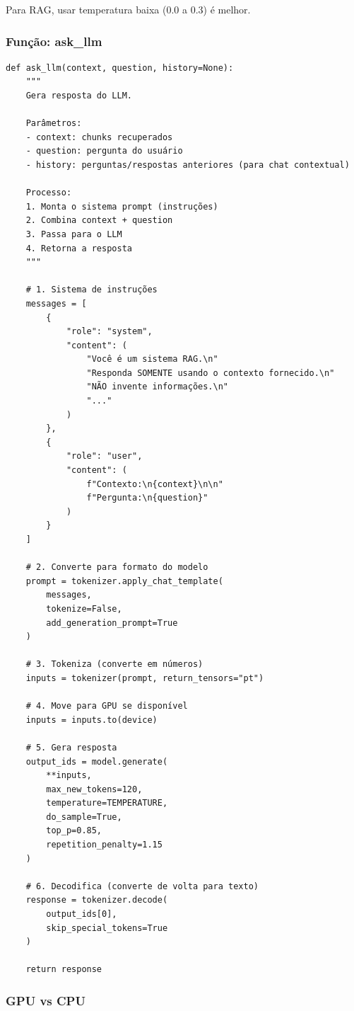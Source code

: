 \documentclass[12pt,a4paper]{article}
\begin{document}
Para RAG, usar temperatura baixa (0.0 a 0.3) é melhor.

\subsubsection{Função: ask\_llm}

\begin{lstlisting}
def ask_llm(context, question, history=None):
    """
    Gera resposta do LLM.
    
    Parâmetros:
    - context: chunks recuperados
    - question: pergunta do usuário
    - history: perguntas/respostas anteriores (para chat contextual)
    
    Processo:
    1. Monta o sistema prompt (instruções)
    2. Combina context + question
    3. Passa para o LLM
    4. Retorna a resposta
    """
    
    # 1. Sistema de instruções
    messages = [
        {
            "role": "system",
            "content": (
                "Você é um sistema RAG.\n"
                "Responda SOMENTE usando o contexto fornecido.\n"
                "NÃO invente informações.\n"
                "..."
            )
        },
        {
            "role": "user",
            "content": (
                f"Contexto:\n{context}\n\n"
                f"Pergunta:\n{question}"
            )
        }
    ]
    
    # 2. Converte para formato do modelo
    prompt = tokenizer.apply_chat_template(
        messages,
        tokenize=False,
        add_generation_prompt=True
    )
    
    # 3. Tokeniza (converte em números)
    inputs = tokenizer(prompt, return_tensors="pt")
    
    # 4. Move para GPU se disponível
    inputs = inputs.to(device)
    
    # 5. Gera resposta
    output_ids = model.generate(
        **inputs,
        max_new_tokens=120,
        temperature=TEMPERATURE,
        do_sample=True,
        top_p=0.85,
        repetition_penalty=1.15
    )
    
    # 6. Decodifica (converte de volta para texto)
    response = tokenizer.decode(
        output_ids[0],
        skip_special_tokens=True
    )
    
    return response
\end{lstlisting}

\subsubsection{GPU vs CPU}
\end{document}
